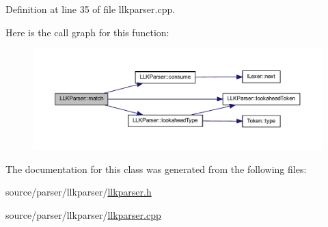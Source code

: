 Definition at line 35 of file llkparser.cpp.



Here is the call graph for this function:\nopagebreak
\begin{figure}[H]
\begin{center}
\leavevmode
\includegraphics[width=400pt]{class_l_l_k_parser_adefd01a8ab2f64530cf3918fc74885a6_cgraph}
\end{center}
\end{figure}




The documentation for this class was generated from the following files:\begin{DoxyCompactItemize}
\item 
source/parser/llkparser/\hyperlink{llkparser_8h}{llkparser.h}\item 
source/parser/llkparser/\hyperlink{llkparser_8cpp}{llkparser.cpp}\end{DoxyCompactItemize}
